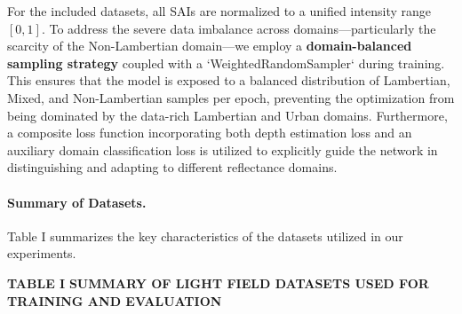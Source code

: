 For the included datasets, all SAIs are normalized to a unified intensity range $[0, 1]$. To address the severe data imbalance across domains—particularly the scarcity of the Non-Lambertian domain—we employ a \textbf{domain-balanced sampling strategy} coupled with a `WeightedRandomSampler` during training. This ensures that the model is exposed to a balanced distribution of Lambertian, Mixed, and Non-Lambertian samples per epoch, preventing the optimization from being dominated by the data-rich Lambertian and Urban domains. Furthermore, a composite loss function incorporating both depth estimation loss and an auxiliary domain classification loss is utilized to explicitly guide the network in distinguishing and adapting to different reflectance domains.

\paragraph{Summary of Datasets.}
Table I summarizes the key characteristics of the datasets utilized in our experiments.

\textbf{TABLE I}
\textbf{SUMMARY OF LIGHT FIELD DATASETS USED FOR TRAINING AND EVALUATION}

\begin{table}[!t]
\small
\caption{Dataset Domain / Scene Type No. of Scenes.}
\label{tab:table1}
\centering
{}
\end{table}
